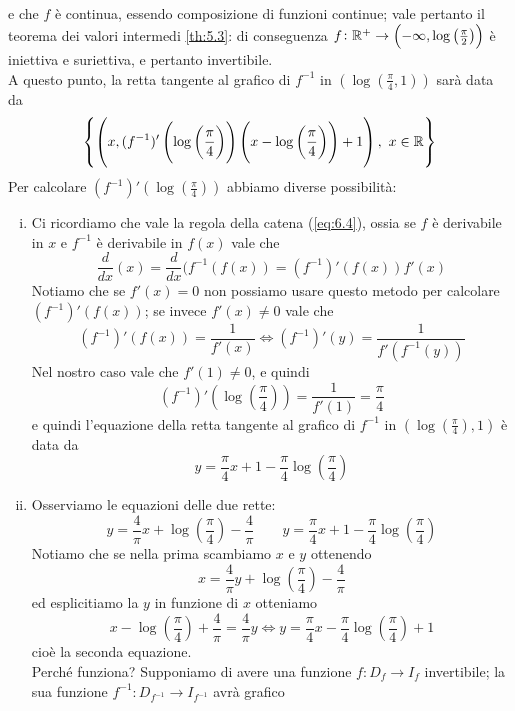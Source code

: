 \begin{example}
\[    \]
    e che $f$ è continua, essendo composizione di funzioni continue; vale pertanto il teorema dei valori intermedi \ref{th:5.3}: di conseguenza $f\colon \amsbb{R}^+ \to \left(-\infty, \log\left(\frac{\pi}{2}\right)\right)$ è iniettiva e suriettiva, e pertanto invertibile. \\
    A questo punto, la retta tangente al grafico di $f^{-1}$ in $\left(\log\left(\frac{\pi}{4}, 1\right)\right)$ sarà data da
    \[
    \left\{\left(x, (f^{-1})'\left(\log\left(\frac{\pi}{4}\right)\right)\left(x-\log\left(\frac{\pi}{4}\right)\right)+1\right), \ x\in\amsbb{R}\right\}
    \]
    Per calcolare $(f^{-1})'\left(\log\left(\frac{\pi}{4}\right)\right)$ abbiamo diverse possibilità:
    \begin{enumerate}[(i)]
        \item Ci ricordiamo che vale la regola della catena (\ref{eq:6.4}), ossia se $f$ è derivabile in $x$ e $f^{-1}$ è derivabile in $f(x)$ vale che
        \[
        \frac{d}{dx}(x) = \frac{d}{dx}(f^{-1}(f(x)) = (f^{-1})'(f(x)) f'(x) 
        \]
        Notiamo che se $f'(x) = 0$ non possiamo usare questo metodo per calcolare $(f^{-1})'(f(x))$; se invece $f'(x)\ne 0$ vale che
        \[
        (f^{-1})'(f(x)) = \frac{1}{f'(x)} \iff (f^{-1})'(y) = \frac{1}{f'(f^{-1}(y))}
        \]
        Nel nostro caso vale che $f'(1) \ne 0$, e quindi
        \[
        (f^{-1})'\left(\log\left(\frac{\pi}{4}\right)\right) = \frac{1}{f'(1)} = \frac{\pi}{4}
        \]
        e quindi l'equazione della retta tangente al grafico di $f^{-1}$ in $\left(\log\left(\frac{\pi}{4}\right), 1\right)$ è data da
        \[
        y=\frac{\pi}{4}x+1 - \frac{\pi}{4}\log\left(\frac{\pi}{4}\right)
        \]
        \item Osserviamo le equazioni delle due rette:
        \[
        y=\frac{4}{\pi}x + \log\left(\frac{\pi}{4}\right)-\frac{4}{\pi} \qquad y=\frac{\pi}{4}x+1 - \frac{\pi}{4}\log\left(\frac{\pi}{4}\right)
        \]
        Notiamo che se nella prima scambiamo $x$ e $y$ ottenendo
        \[
        x=\frac{4}{\pi}y+\log\left(\frac{\pi}{4}\right)-\frac{4}{\pi}
        \]
        ed esplicitiamo la $y$ in funzione di $x$ otteniamo
        \[
        x- \log\left(\frac{\pi}{4}\right)+\frac{4}{\pi} = \frac{4}{\pi}y \iff y = \frac{\pi}{4}x-\frac{\pi}{4}\log\left(\frac{\pi}{4}\right)+1
        \]
        cioè la seconda equazione.\\
        Perché funziona? Supponiamo di avere una funzione $f\colon D_f\to I_f$ invertibile; la sua funzione $f^{-1}\colon D_{f^{-1}}\to I_{f^{-1}}$ avrà grafico

\end{enumerate}
\end{example}
